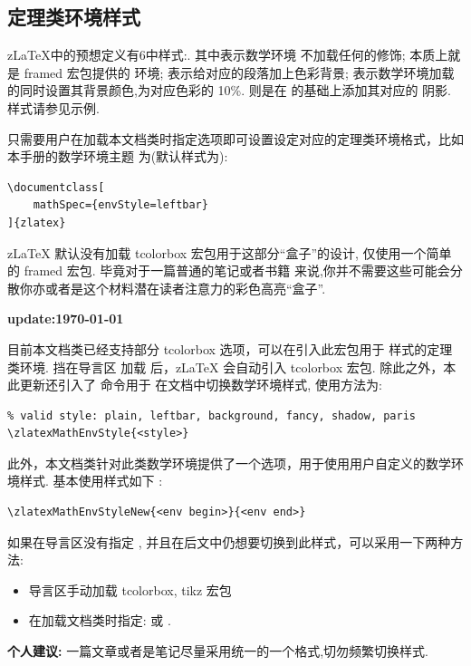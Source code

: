\subsection{定理类环境样式}
z\LaTeX{}中的预想定义有6中样式:. 其中表示数学环境
不加载任何的修饰; 本质上就是 {framed} 宏包提供的  环境; 表示给对应的段落加上色彩背景; 
表示数学环境加载的同时设置其背景颜色,为对应色彩的 10\%.  则是在  的基础上添加其对应的
阴影.  样式请参见示例.

只需要用户在加载本文档类时指定选项即可设置设定对应的定理类环境格式，比如本手册的数学环境主题
为(默认样式为):

\begin{verbatim}
\documentclass[
    mathSpec={envStyle=leftbar}
]{zlatex}
\end{verbatim}

z\LaTeX{} 默认没有加载 tcolorbox 宏包用于这部分``盒子''的设计, 仅使用一个简单的 framed 宏包. 毕竟对于一篇普通的笔记或者书籍
来说,你并不需要这些可能会分散你亦或者是这个材料潜在读者注意力的彩色高亮``盒子''. 

\bigskip
\noindent\textbf{update:\today}\par
目前本文档类已经支持部分 tcolorbox 选项，可以在引入此宏包用于  样式的定理类环境. 挡在导言区
加载 后，z\LaTeX{} 会自动引入 tcolorbox 宏包. 除此之外，本此更新还引入了 \cmd{\zlatexMathEnvStyle} 命令用于
在文档中切换数学环境样式, 使用方法为:
\begin{verbatim}
% valid style: plain, leftbar, background, fancy, shadow, paris
\zlatexMathEnvStyle{<style>}
\end{verbatim}

此外，本文档类针对此类数学环境提供了一个选项，用于使用用户自定义的数学环境样式. 基本使用样式如下
\index{\cmd{\zlatexMathEnvStyleNew}}:
\begin{verbatim}
\zlatexMathEnvStyleNew{<env begin>}{<env end>}
\end{verbatim}

\begin{remark}
如果在导言区没有指定 , 并且在后文中仍想要切换到此样式，可以采用一下两种方法:
\begin{itemize}
  \item 导言区手动加载 tcolorbox, tikz 宏包
  \item 在加载文档类时指定:  或 .
\end{itemize} 

\noindent\textbf{个人建议:} 一篇文章或者是笔记尽量采用统一的一个格式,切勿频繁切换样式.
\end{remark}

